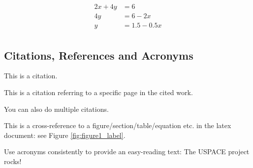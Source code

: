 \begin{equation}
\begin{split}
\label{eq:equation2_label}
2x+4y&=6\\	%
4y&=6-2x\\
y&=1.5-0.5x\\
\end{split}
\end{equation}


\subsection{Citations, References and Acronyms}

This is a citation\cite{CitationReference1}.

This is a citation referring to a specific page in the cited work\cite[28]{CitationReference1}. 

You can also do multiple citations\cite{CitationReference1,CitationReference2}.

This is a cross-reference to a figure/section/table/equation etc. in the latex document: see Figure \ref{fig:figure1_label}.

Use acronyms consistently to provide an easy-reading text: The \ac{USPACE} project rocks!

